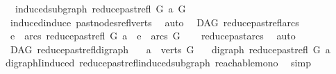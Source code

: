 \begin{isabellebody}
\ \ \ {\isachardoublequoteopen}induced{\isacharunderscore}{\kern0pt}subgraph\ {\isacharparenleft}{\kern0pt}reduce{\isacharunderscore}{\kern0pt}past{\isacharunderscore}{\kern0pt}refl\ G\ a{\isacharparenright}{\kern0pt}\ G{\isachardoublequoteclose}\isanewline
%
\isadelimproof
\ \ %
\endisadelimproof
%
\isatagproof
{}\isamarkupfalse%
\ \ induced{\isacharunderscore}{\kern0pt}induce\ past{\isacharunderscore}{\kern0pt}nodes{\isacharunderscore}{\kern0pt}refl{\isacharunderscore}{\kern0pt}verts\ \isamarkupfalse%
\ auto%
\endisatagproof
{\isafoldproof}%
%
\isadelimproof
\isanewline
%
\endisadelimproof
\isanewline
{}\isamarkupfalse%
\ {\isacharparenleft}{\kern0pt}\ DAG{\isacharparenright}{\kern0pt}\ reduce{\isacharunderscore}{\kern0pt}past{\isacharunderscore}{\kern0pt}refl{\isacharunderscore}{\kern0pt}arcs{}{\isacharcolon}{\kern0pt}\isanewline
\ \ {\isachardoublequoteopen}e\ {\isasymin}\ arcs\ {\isacharparenleft}{\kern0pt}reduce{\isacharunderscore}{\kern0pt}past{\isacharunderscore}{\kern0pt}refl\ G\ a{\isacharparenright}{\kern0pt}\ {\isasymLongrightarrow}\ e\ {\isasymin}\ arcs\ G{\isachardoublequoteclose}\isanewline
%
\isadelimproof
\ \ %
\endisadelimproof
%
\isatagproof
{}\isamarkupfalse%
\ reduce{\isacharunderscore}{\kern0pt}past{\isacharunderscore}{\kern0pt}arcs\ \isamarkupfalse%
\ auto%
\endisatagproof
{\isafoldproof}%
%
\isadelimproof
\isanewline
%
\endisadelimproof
\isanewline
{}\isamarkupfalse%
\ {\isacharparenleft}{\kern0pt}\ DAG{\isacharparenright}{\kern0pt}\ reduce{\isacharunderscore}{\kern0pt}past{\isacharunderscore}{\kern0pt}refl{\isacharunderscore}{\kern0pt}digraph{\isacharcolon}{\kern0pt}\isanewline
\ \ \ {\isachardoublequoteopen}a\ {\isasymin}\ verts\ G{\isachardoublequoteclose}\isanewline
\ \ \ {\isachardoublequoteopen}digraph\ {\isacharparenleft}{\kern0pt}reduce{\isacharunderscore}{\kern0pt}past{\isacharunderscore}{\kern0pt}refl\ G\ a{\isacharparenright}{\kern0pt}{\isachardoublequoteclose}\isanewline
%
\isadelimproof
\ \ %
\endisadelimproof
%
\isatagproof
{}\isamarkupfalse%
\ digraphI{\isacharunderscore}{\kern0pt}induced\ reduce{\isacharunderscore}{\kern0pt}past{\isacharunderscore}{\kern0pt}refl{\isacharunderscore}{\kern0pt}induced{\isacharunderscore}{\kern0pt}subgraph\ reachable{\isacharunderscore}{\kern0pt}mono\ \isamarkupfalse%
\ simp%
\endisatagproof
{\isafoldproof}%
%
\isadelimproof
%
\endisadelimproof
%
\isadelimdocument
%

\end{isabellebody}
